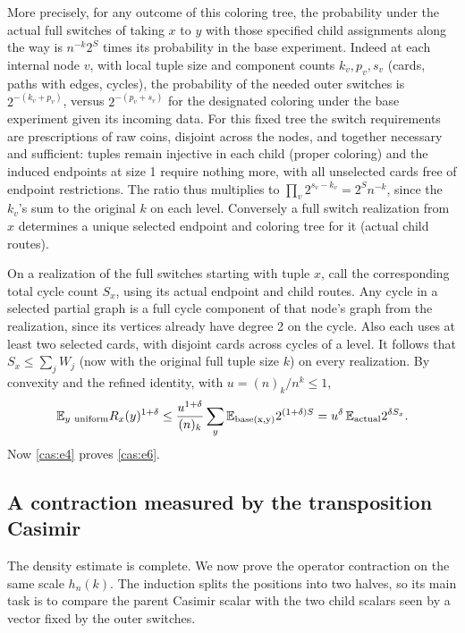 More precisely, for any outcome of this coloring tree, the probability under the actual full switches of taking \(x\) to \(y\) with those specified child assignments along the way is \(n^{-k}2^S\) times its probability in the base experiment. Indeed at each internal node \(v\), with local tuple size and component counts \(k_v,p_v,s_v\) (cards, paths with edges, cycles), the probability of the needed outer switches is \(2^{-(k_v+p_v)}\), versus \(2^{-(p_v+s_v)}\) for the designated coloring under the base experiment given its incoming data. For this fixed tree the switch requirements are prescriptions of raw coins, disjoint across the nodes, and together necessary and sufficient: tuples remain injective in each child (proper coloring) and the induced endpoints at size 1 require nothing more, with all unselected cards free of endpoint restrictions. The ratio thus multiplies to \(\prod_v 2^{s_v-k_v}=2^S n^{-k}\), since the \(k_v\)'s sum to the original \(k\) on each level. Conversely a full switch realization from \(x\) determines a unique selected endpoint and coloring tree for it (actual child routes).

On a realization of the full switches starting with tuple \(x\), call the corresponding total cycle count \(S_x\), using its actual endpoint and child routes. Any cycle in a selected partial graph is a full cycle component of that node's graph from the realization, since its vertices already have degree 2 on the cycle. Also each uses at least two selected cards, with disjoint cards across cycles of a level. It follows that \(S_x\le\sum_j W_j\) (now with the original full tuple size \(k\)) on every realization. By convexity and the refined identity, with \(u=(n)_k/n^k\le 1\),
\[
\mathbb E_{y\ {\rm uniform}} R_x(y)^{1+\delta}
\le \frac{u^{1+\delta}}{(n)_k}\sum_y \mathbb E_{\rm base(x,y)} 2^{(1+\delta)S}
= u^\delta \,\mathbb E_{\rm actual} 2^{\delta S_x}.
\]
Now \eqref{cas:e4} proves \eqref{cas:e6}.

\subsection{A contraction measured by the transposition Casimir}

The density estimate is complete.  We now prove the operator contraction
on the same scale $h_n(k)$.  The induction splits the positions into two
halves, so its main task is to compare the parent Casimir scalar with the
two child scalars seen by a vector fixed by the outer switches.


